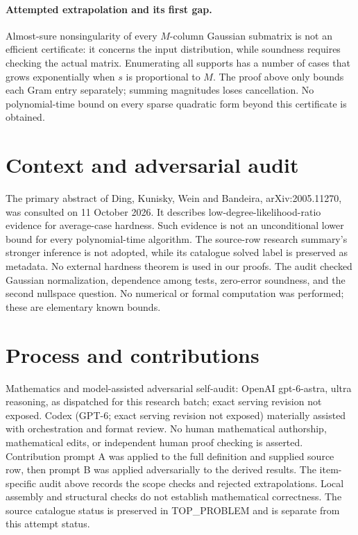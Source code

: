 \documentclass[11pt]{article}
\begin{document}
\paragraph{Attempted extrapolation and its first gap.}
Almost-sure nonsingularity of every $M$-column Gaussian submatrix is not an
efficient certificate: it concerns the input distribution, while soundness
requires checking the actual matrix. Enumerating all supports has a number
of cases that grows exponentially when $s$ is proportional to $M$.
The proof above only bounds each Gram entry separately; summing magnitudes
loses cancellation. No polynomial-time bound on every sparse quadratic form
beyond this certificate is obtained.

\section{Context and adversarial audit}
The primary abstract of Ding, Kunisky, Wein and Bandeira, arXiv:2005.11270,
was consulted on 11 October 2026. It describes low-degree-likelihood-ratio
evidence for average-case hardness. Such evidence is not an unconditional
lower bound for every polynomial-time algorithm. The source-row research
summary's stronger inference is not adopted, while its catalogue solved
label is preserved as metadata. No external hardness theorem is used in our
proofs. The audit checked Gaussian normalization, dependence among tests,
zero-error soundness, and the second nullspace question. No numerical or
formal computation was performed; these are elementary known bounds.

\section{Process and contributions}
Mathematics and model-assisted adversarial self-audit: OpenAI gpt-6-astra, ultra reasoning, as dispatched for this research batch; exact serving revision not exposed. Codex (GPT-6; exact serving revision not exposed) materially assisted with orchestration and format review. No human mathematical authorship, mathematical edits, or independent human proof checking is asserted.
Contribution prompt A was applied to the full definition and supplied source row, then prompt B was applied adversarially to the derived results. The item-specific audit above records the scope checks and rejected extrapolations. Local assembly and structural checks do not establish mathematical correctness. The source catalogue status is preserved in TOP\_PROBLEM and is separate from this attempt status.
\end{document}
